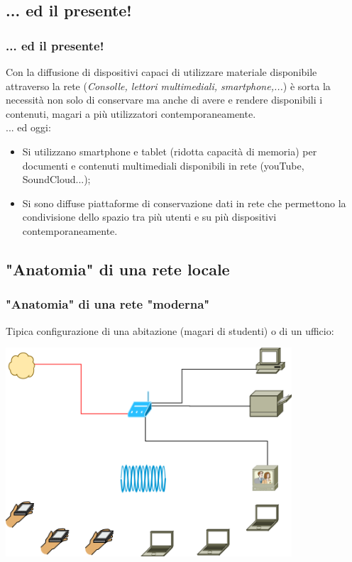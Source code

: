 \documentclass[11pt,xcolor=table]{beamer}
\begin{document}
\subsection{... ed il presente!}
\begin{frame}
	\frametitle{... ed il presente!}
	
	Con la diffusione di dispositivi capaci di utilizzare materiale disponibile attraverso la rete (\textit{Consolle, lettori multimediali, smartphone,...}) è sorta la necessità non solo di conservare ma anche di avere e rendere disponibili i contenuti, magari a più utilizzatori contemporaneamente.\\
		
	\vspace{0.3cm}	
	... ed oggi:
	\begin{itemize}
		\item Si utilizzano smartphone e tablet (ridotta capacità di memoria) per documenti e contenuti multimediali disponibili in rete (youTube\textregistered, SoundCloud\textregistered...);
		\item Si sono diffuse piattaforme di conservazione dati in rete che permettono la condivisione dello spazio tra più utenti e su più dispositivi contemporaneamente.
	\end{itemize}
\end{frame}

\subsection{"Anatomia" di una rete locale}

\begin{frame}
	\frametitle["Anatomia" di una rete]{"Anatomia" di una rete "moderna"}
		Tipica configurazione di una abitazione (magari di studenti) o di un ufficio:
	
	\begin{center}
		\includegraphics[width=0.8\textwidth]{SchemiRete/AnatomiaReteNoNas.png}
	\end{center}
\end{frame}
\end{document}
